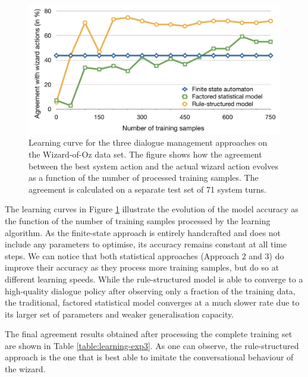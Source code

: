 \begin{figure}[h]
\begin{center}
\includegraphics[scale=0.38]{imgs/curve-exp3.pdf}
\end{center} 
\caption{Learning curve for the three dialogue management approaches on the Wizard-of-Oz data set.  The figure shows how the agreement between the best system action and the actual wizard action evolves as a function of the number of processed training samples.  The agreement is calculated on a separate test set of 71 system turns.}
\label{fig:curve-exp3}
\end{figure}


The learning curves in Figure \ref{fig:curve-exp3} illustrate the evolution of the model accuracy as the function of the number of training samples processed by the learning algorithm.  As the finite-state approach is entirely handcrafted and does not include any parameters to optimise, its accuracy remains constant at all time steps. We can notice that both statistical approaches (Approach 2 and 3) do improve their accuracy as they process more training samples, but do so at different learning speeds.  While the rule-structured model is able to converge to a high-quality dialogue policy after observing only a fraction of the training data, the traditional, factored statistical model converges at a much slower rate due to its larger set of parameters and weaker generalisation capacity. 

The final agreement results obtained after processing the complete training set are shown in Table \ref{table:learning-exp3}.  As one can observe, the rule-structured approach is the one that is best able to imitate the conversational behaviour of the wizard. 

